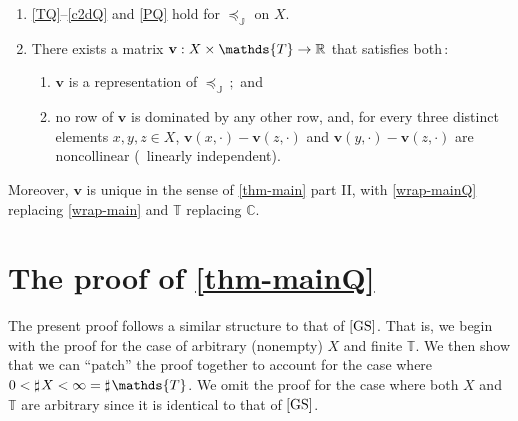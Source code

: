\documentclass[12pt,a4paper,twoside]{article}
\newcommand{\gsii}{$\textup{[GS]}$}
\newcommand{\preceqb}{\mathbin{\preceq}}
\newcommand{\countof}{\mathbin{\sharp}\hskip1pt}
\newcommand{\ext}{\mathrel{\mc R}}
\newcommand{\sext}{\mathrel{\mc P}}
\newcommand{\next}{\mathrel{\mc I}}
\newcommand{\sextb}{\mathbin{\mc P}}
\newcommand{\mbbc}{{\mathds C}}
\newcommand{\mbbt}{{\mathds {T}}}
\newcommand{\mbbj}{\mathds J}
\newcommand{\xy}{{(x, y)}}
\begin{document}
\begin{appendices}
\begin{theorem}
\begin{enumerate}[label=\textup{(\ref{thm-mainQ}.\roman*)}]

\item\label{ax-mainQ}

 \ref{TQ}--\ref{c2dQ} and
 \ref{PQ} hold for   $\preceqb _ { \mbbj } $ on $X$.
 
    
\item\label{wrap-mainQ} There exists a matrix
  $ \mathbf{v} : X \times \mbbt \rightarrow \R $ that satisfies both$\,:$
  \begin{enumerate}[label=\textup{(\ref{thm-mainQ}.\alph*)}]
  \item\label{rep-mainQ}
  $ \mathbf{v} $ is a representation of $ \preceq _ { \mbbj }$$\,;$ and

\item\label{rows-mainQ} no row of
  $\mathbf{v}$ is dominated by any other row, and, for every three distinct elements
  $x,y, z \in X$, $\mathbf{v}(x,\cdot)-\mathbf{v}(z,\cdot)
  $ and $\mathbf{v}(y,\cdot)-\mathbf{v}(z,\cdot)$ are noncollinear (\ie\ linearly independent).
\end{enumerate}
\end{enumerate}
Moreover, $\mathbf{v}$ is unique in the sense of \cref{thm-main} part II, with
\ref{wrap-mainQ} replacing \ref{wrap-main} and $\mbbt$ replacing $\mbbc$.
\end{theorem}


\section{The proof of \cref{thm-mainQ}}\label{sec-proof-mainQ}
The present proof follows a similar structure to that of \gsii. That is, we
begin with the proof for the case of arbitrary (nonempty) $ X $ and finite
$ \mbbt $. We then show that we can ``patch'' the proof together to account for
the case where $0 <  \countof X < \infty = \countof \mbbt$. We omit the proof for the
case where both $X$ and $\mbbt$ are arbitrary since it is identical to that of \gsii.




\end{appendices}
\end{document}
